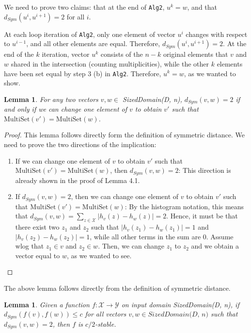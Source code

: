 \documentclass[11pt,a4paper]{article}
\newtheorem{lemma}[theorem]{Lemma}
\theoremstyle{definition}
\newcommand{\MultiSet}{\mathrm{MultiSet}}
\begin{document}
We need to prove two claims: that at the end of \texttt{Alg2}, $u^k = w$, and that $d_{Sym}(u^i, u^{i+1}) = 2$ for all $i$. 

At each loop iteration of \texttt{Alg2}, only one element of vector $u^i$ changes with respect to $u^{i-1}$, and all other elements are equal. Therefore, $d_{Sym}(u^i, u^{i+1}) = 2$. At the end of the $k$ iteration, vector $u^k$ consists of the $n-k$ original elements that $v$ and $w$ shared in the intersection (counting multiplicities), while the other $k$ elements have been set equal by step 3 (b) in \texttt{Alg2}. Therefore, $u^k = w$, as we wanted to show.

\begin{lemma}\label{lemma:path2}
    For any two vectors $v, w \in$ \textit{SizedDomain(D, n)}, $d_{Sym}(v, w) = 2$ if and only if we can change one element of $v$ to obtain $v'$ such that $\MultiSet(v') = \MultiSet(w)$.
\end{lemma}

\begin{proof}
    This lemma follows directly form the definition of symmetric distance. We need to prove the two directions of the implication:
    \begin{enumerate}
        \item If we can change one element of $v$ to obtain $v'$ such that $\MultiSet(v') = \MultiSet(w)$, then $d_{Sym}(v, w) = 2$: This direction is already shown in the proof of Lemma 4.1.
        \item If $d_{Sym}(v, w) = 2$, then we can change one element of $v$ to obtain $v'$ such that $\MultiSet(v') = \MultiSet(w)$: By the histogram notation, this means that $d_{Sym}(v, w) = \sum_{z \in \mathcal{X}} |h_v(z) - h_w(z)| = 2$. Hence, it must be that there exist two $z_1$ and $z_2$ such that $|h_v(z_1) - h_w(z_1)| = 1$ and $|h_v(z_2) - h_w(z_2)| = 1$, while all other terms in the sum are 0. Assume wlog that $z_1 \in v$ and $z_2 \in w$. Then, we can change $z_1$ to $z_2$ and we obtain a vector equal to $w$, as we wanted to see.
    \end{enumerate}
\end{proof}

The above lemma follows directly from the definition of symmetric distance. 

\begin{lemma}\label{lemma:path3}
Given a function $f: \mathcal{X} \rightarrow \mathcal{Y}$ on input domain \textit{SizedDomain(D, n)}, if $d_{Sym}(f(v), f(w)) \leq c$ for all vectors $v, w \in \textit{SizedDomain(D, n)}$ such that $d_{Sym}(v, w) = 2$, then $f$ is $c/2$-stable.
\end{lemma}
\end{document}

